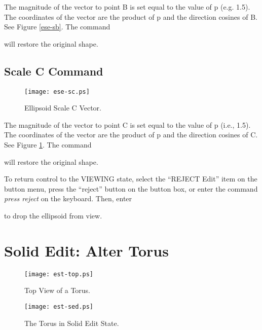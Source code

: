 The magnitude of the vector to point B is set equal to the value of p
(e.g. 1.5).
The coordinates of the vector are the product of p and the
direction cosines of B.  See Figure \ref{ese-sb}.  The command


will restore the original shape.

\subsection{Scale C Command}

\begin{figure}
\centering \texttt{[image: ese-sc.ps]}
\caption{Ellipsoid Scale C Vector.}
\label{ese-sc}
\end{figure}


The magnitude of the vector to point C is set equal to the value of p
(i.e., 1.5).
The coordinates of the vector are the product of p and the
direction cosines of C.  See Figure \ref{ese-sc}.  The command


will restore the original shape.

To return control to the VIEWING state, select the ``REJECT Edit''
item on the button menu, press the ``reject'' button on the button box,
or enter the command {\em press reject} on the keyboard.
Then, enter


to drop the ellipsoid from view.

\section{Solid Edit: Alter Torus}

\begin{figure}
\centering \texttt{[image: est-top.ps]}
\caption{Top View of a Torus.}
\label{est-top}
\end{figure}

\begin{figure}
\centering \texttt{[image: est-sed.ps]}
\caption{The Torus in Solid Edit State.}
\label{est-sed}
\end{figure}

